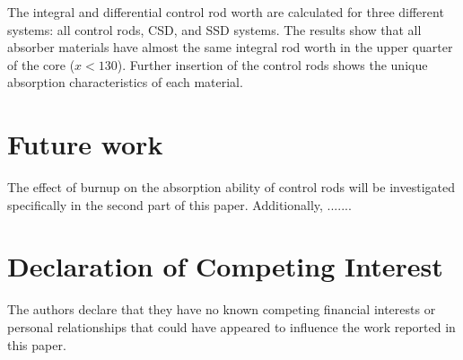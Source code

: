 The integral and differential control rod worth are calculated for three different systems: all control rods, CSD, and SSD systems. The results show that all absorber materials have almost the same integral rod worth in the upper quarter of the core ($x$$<$$130$). Further insertion of the control rods shows the unique absorption characteristics of each material.

\section{Future work}
The effect of burnup on the absorption ability of control rods will be investigated specifically in the second part of this paper. Additionally, .......

\section{Declaration of Competing Interest}

The authors declare that they have no known competing financial interests or personal relationships that could have appeared to influence the work reported in this paper.
